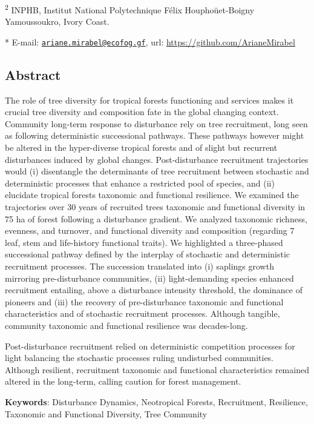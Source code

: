 \documentclass[
  11pt,
  french,
  A4paper,
  extrafontsizes,onecolumn,openright
  ]{memoir}
\begin{document}
\textsuperscript{2} INPHB, Institut National Polytechnique Félix
Houphoüet-Boigny Yamoussoukro, Ivory Coast. \newline

* E-mail:
\href{mailto:ariane.mirabel@ecofog.gf}{\nolinkurl{ariane.mirabel@ecofog.gf}},
url: \url{https://github.com/ArianeMirabel}

\subsection{Abstract}\label{abstract-2}

The role of tree diversity for tropical forests functioning and services
makes it crucial tree diversity and composition fate in the global
changing context. Community long-term response to disturbance rely on
tree recruitment, long seen as following deterministic successional
pathways. These pathways however might be altered in the hyper-diverse
tropical forests and of slight but recurrent disturbances induced by
global changes. Post-disturbance recruitment trajectories would (i)
disentangle the determinants of tree recruitment between stochastic and
deterministic processes that enhance a restricted pool of species, and
(ii) elucidate tropical forests taxonomic and functional resilience. We
examined the trajectories over 30 years of recruited trees taxonomic and
functional diversity in 75 ha of forest following a disturbance
gradient. We analyzed taxonomic richness, evenness, and turnover, and
functional diversity and composition (regarding 7 leaf, stem and
life-history functional traits). We highlighted a three-phased
successional pathway defined by the interplay of stochastic and
deterministic recruitment processes. The succession translated into (i)
saplings growth mirroring pre-disturbance communities, (ii)
light-demanding species enhanced recruitment entailing, above a
disturbance intensity threshold, the dominance of pioneers and (iii) the
recovery of pre-disturbance taxonomic and functional characteristics and
of stochastic recruitment processes. Although tangible, community
taxonomic and functional resilience was decades-long.

Post-disturbance recruitment relied on deterministic competition
processes for light balancing the stochastic processes ruling
undisturbed communities. Although resilient, recruitment taxonomic and
functional characteristics remained altered in the long-term, calling
caution for forest management.

\textbf{Keywords}: Disturbance Dynamics, Neotropical Forests,
Recruitment, Resilience, Taxonomic and Functional Diversity, Tree
Community
\end{document}
